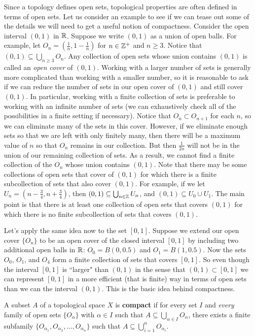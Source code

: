 Since a topology defines open sets, topological properties are often defined in terms of open sets. Let us consider an example to see if we can tease out some of the details we will need to get a useful notion of compactness. Consider the open interval $(0, 1)$ in $\mathbb{R}$. Suppose we write $(0, 1)$ as a union of open balls. For example, let $O_n = \left(\frac{1}{n}, 1-\frac{1}{n}\right)$ for $n \in \mathbb{Z}^+$ and $n \geq 3$. Notice that $(0, 1) \subseteq \bigcup_{n \geq 3} O_n$. Any collection of open sets whose union contains $(0, 1)$ is called an \emph{open cover} of $(0, 1)$. Working with a larger number of sets is generally more complicated than working with a smaller number, so it is reasonable to ask if we can reduce the number of sets in our open cover of $(0, 1)$ and still cover $(0, 1)$. In particular, working with a finite collection of sets is preferable to working with an infinite number of sets (we can exhaustively check all of the possibilities in a finite setting if necessary). Notice that $O_n \subset O_{n+1}$ for each $n$, so we can eliminate many of the sets in this cover. However, if we eliminate enough sets so that we are left with only finitely many, then there will be a maximum value of $n$ so that $O_n$ remains in our collection. But then $\frac{1}{2n}$ will not be in the union of our remaining collection of sets. As a result, we cannot find a finite collection of the $O_n$ whose union contains $(0, 1)$. Note that there may be some collections of open sets that cover of $(0,1)$ for which there is a finite subcollection of sets that also cover $(0,1)$. For example, if we let $U_n = \left(n-\frac{3}{4}, n+\frac{3}{4}\right)$, then $(0,1) \subseteq \bigcup_{n \in \mathbb{Z}} U_n$, and $(0,1) \subseteq U_{0} \cup U_1$. The main point is that there is at least one collection of open sets that covers $(0,1)$ for which there is no finite subcollection of sets that covers $(0,1)$. 
 
Let's apply the same idea now to the set $[0, 1]$. Suppose we extend our open cover $\{O_n\}$ to be an open cover of the closed interval $[0, 1]$ by including two additional open balls in $\mathbb{R}$: $O_0 = B(0, 0.5)$ and $O_1 = B(1, 0.5)$. Now the sets $O_0$, $O_1$, and $O_4$ form a finite collection of sets that covers $[0, 1]$. So even though the interval $[0, 1]$ is ``larger" than $(0, 1)$ in the sense that $(0, 1) \subset [0, 1]$ we can represent $[0, 1]$ in a more efficient (that is finite) way in terms of open sets than we can the interval $(0, 1)$. This is the basic idea behind compactness. 

\begin{definition} \label{def:compact} A subset $A$ of a topological space $X$ is \textbf{compact} if for every set $I$ and \emph{every} family of open sets $\{O_{\alpha}\}$ with $\alpha \in I$ such that $A \subseteq \bigcup_{\alpha \in I} O_{\alpha}$, there exists a finite subfamily $\{O_{\alpha_1}, O_{\alpha_2}, \ldots, O_{\alpha_n}\}$ such that $A \subseteq \bigcup_{i = 1}^n O_{\alpha_i}$. 
\end{definition}

